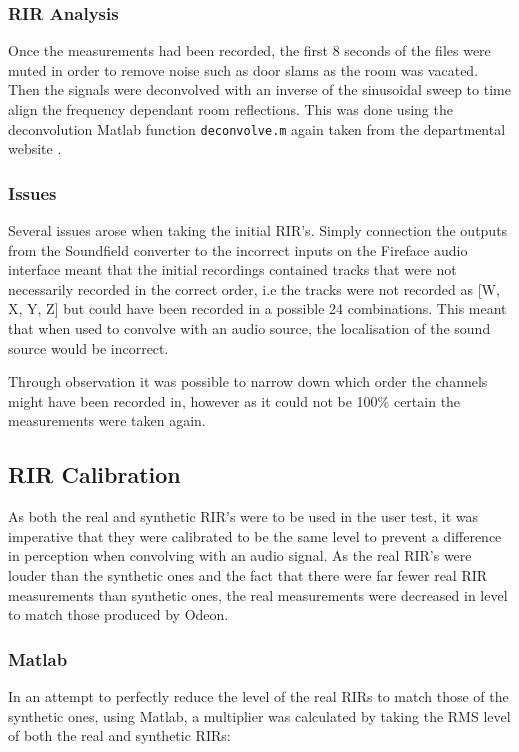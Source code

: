 \documentclass[../../main.tex]{subfiles}
\begin{document}
	\subsubsection{RIR Analysis}

		Once the measurements had been recorded, the first 8 seconds of the files were muted in order to remove noise such as door slams as the room was vacated. Then the signals were deconvolved with an inverse of the sinusoidal sweep to time align the frequency dependant room reflections. This was done using the deconvolution Matlab function \texttt{deconvolve.m} again taken from the departmental website \cite{sineSweep}.

	\subsubsection{Issues}
		Several issues arose when taking the initial \ac{RIR}'s. Simply connection the outputs from the Soundfield converter to the incorrect inputs on the Fireface audio interface meant that the initial recordings contained tracks that were not necessarily recorded in the correct order, i.e the tracks were not recorded as [W, X, Y, Z] but could have been recorded in a possible 24 combinations. This meant that when used to convolve with an audio source, the localisation of the sound source would be incorrect.

		Through observation it was possible to narrow down which order the channels might have been recorded in, however as it could not be 100\% certain the measurements were taken again.

\subsection{RIR Calibration}
	
	As both the real and synthetic \ac{RIR}'s were to be used in the user test, it was imperative that they were calibrated to be the same level to prevent a difference in perception when convolving with an audio signal. As the real \ac{RIR}'s were louder than the synthetic ones and the fact that there were far fewer real \ac{RIR} measurements than synthetic ones, the real measurements were decreased in level to match those produced by Odeon.

	\subsubsection{Matlab}

	In an attempt to perfectly reduce the level of the real \ac{RIRs} to match those of the synthetic ones, using Matlab, a multiplier was calculated by taking the RMS level of both the real and synthetic \ac{RIRs}:
\end{document}
